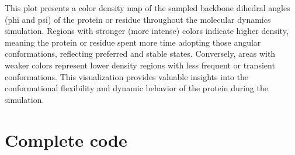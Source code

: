 \documentclass[a4paper,10pt,english]{sphinxmanual}
\let\sphinxpxdimen\pdfpxdimen\else\newdimen\sphinxpxdimen
\begin{document}
\noindent{\hspace*{\fill}\sphinxincludegraphics[width=600\sphinxpxdimen]{{PhiPsi}.png}\hspace*{\fill}}

\sphinxAtStartPar
{} This plot presents a color density map of the sampled backbone dihedral angles (phi and psi) of the protein or residue throughout the molecular dynamics simulation. Regions with stronger (more intense) colors indicate higher density, meaning the protein or residue spent more time adopting those angular conformations, reflecting preferred and stable states. Conversely, areas with weaker colors represent lower density regions with less frequent or transient conformations. This visualization provides valuable insights into the conformational flexibility and dynamic behavior of the protein during the simulation.


\section{Complete code}
\label{\detokenize{PhiPsi:complete-code}}
\begin{sphinxVerbatim}[commandchars=\\\{\}]
 
\end{sphinxVerbatim}

\begin{sphinxVerbatim}[commandchars=\\\{\}]
 
\end{sphinxVerbatim}
\end{document}
